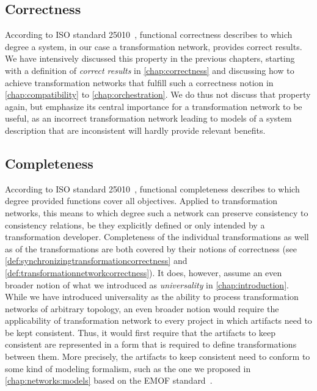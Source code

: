 \subsection{Correctness}

According to ISO standard 25010~\cite{iso25010}, functional correctness describes to which degree a system, in our case a transformation network, provides correct results.
We have intensively discussed this property in the previous chapters, starting with a definition of \emph{correct results} in \autoref{chap:correctness} and discussing how to achieve transformation networks that fulfill such a correctness notion in \autoref{chap:compatibility} to \autoref{chap:orchestration}.
We do thus not discuss that property again, but emphasize its central importance for a transformation network to be useful, as an incorrect transformation network leading to models of a system description that are inconsistent %
will hardly provide relevant benefits.


\subsection{Completeness}

According to ISO standard 25010~\cite{iso25010}, functional completeness describes to which degree provided functions cover all objectives.
Applied to transformation networks, this means to which degree such a network can preserve consistency to consistency relations, be they explicitly defined or only intended by a transformation developer.
Completeness of the individual transformations as well as of the transformations are both covered by their notions of correctness (see \autoref{def:synchronizingtransformationcorrectness} and \autoref{def:transformationnetworkcorrectness}).
It does, however, assume an even broader notion of what we introduced as \emph{universality} in \autoref{chap:introduction}.
While we have introduced universality as the ability to process transformation networks of arbitrary topology, an even broader notion would require the applicability of transformation network to every project in which artifacts need to be kept consistent.
Thus, it would first require that the artifacts to keep consistent are represented in a form that is required to define transformations between them.
More precisely, the artifacts to keep consistent need to conform to some kind of modeling formalism, such as the one we proposed in \autoref{chap:networks:models} based on the \gls{EMOF} standard~\cite{mof}.

